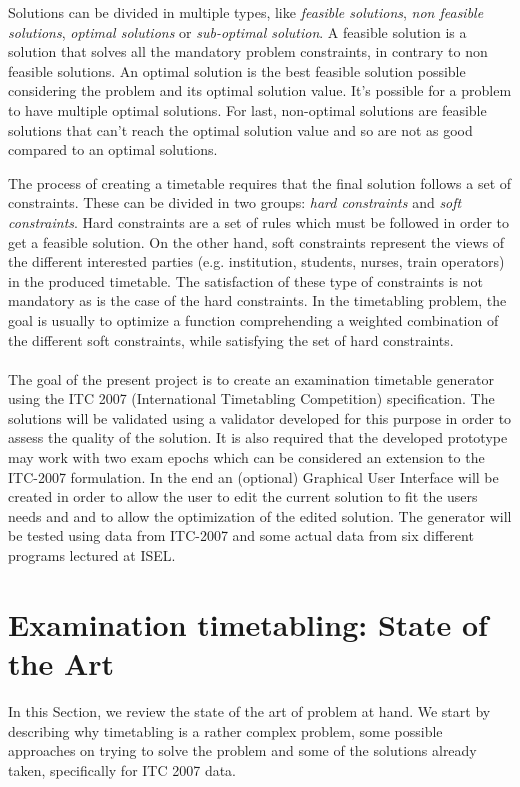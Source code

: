 Solutions can be divided in multiple types, like \textit{feasible solutions}, \textit{non feasible solutions}, \textit{optimal solutions} or \textit{sub-optimal solution}. A feasible solution is a solution that solves all the mandatory problem constraints, in contrary to non feasible solutions. An optimal solution is the best feasible solution possible considering the problem and its optimal solution value. It's possible for a problem to have multiple optimal solutions. For last, non-optimal solutions are feasible solutions that can't reach the optimal solution value and so are not as good compared to an optimal solutions.

The process of creating a timetable requires that the final solution follows a set of constraints. These can be divided in two groups: \textit{hard constraints} and \textit{soft constraints}. Hard constraints are a set of rules which must be followed in order to get a feasible solution. On the other hand, soft constraints represent the views of the different interested parties (e.g. institution, students, nurses, train operators) in the produced timetable. The satisfaction of these type of constraints is not mandatory as is the case of the hard constraints. In the timetabling problem, the goal is usually to optimize a function comprehending a weighted combination of the different soft constraints, while satisfying the set of hard constraints. \\
\\
The goal of the present project is to create an examination timetable generator using the ITC 2007 (International Timetabling Competition) specification. The solutions will be validated using a validator developed for this purpose in order to assess the quality of the solution. It is also required that the developed prototype may work with two exam epochs which can be considered an extension to the ITC-2007 formulation. In the end an (optional) Graphical User Interface will be created in order to allow the user to edit the current solution to fit the users needs and and to allow the optimization of the edited solution. The generator will be tested using data from ITC-2007 and some actual data from six different programs lectured at ISEL.
\section{Examination timetabling: State of the Art}
\label{sec:sota}
In this Section, we review the state of the art of problem at hand. We start by describing why timetabling is a rather complex problem, some possible approaches on trying to solve the problem and some of the solutions already taken, specifically for ITC 2007 data.
\\
